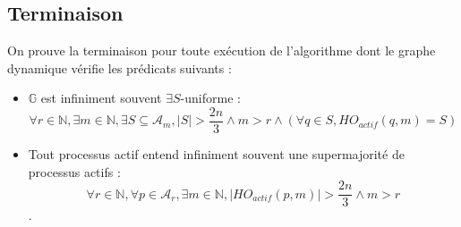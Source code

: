 \documentclass{article}
\begin{document}
\subsection{Terminaison}

On prouve la terminaison pour toute exécution de l'algorithme dont le graphe dynamique vérifie les prédicats suivants :
\begin{itemize}
	\item $\mathds{G}$ est infiniment souvent $\exists S$-uniforme :
		$$\forall r \in \mathds{N}, \exists m \in \mathds{N}, \exists S \subseteq \mathcal{A}_m, |S| > \frac{2 n}{3} \wedge m > r \wedge (\forall q \in S, HO_{actif}(q, m) = S)$$
	\item Tout processus actif entend infiniment souvent une supermajorité de processus actifs :
		$$\forall r \in \mathds{N}, \forall p \in \mathcal{A}_r, \exists m \in \mathds{N}, |HO_{actif}(p,m)| > \frac{2 n}{3} \wedge m > r$$.
\end{itemize}
\end{document}
